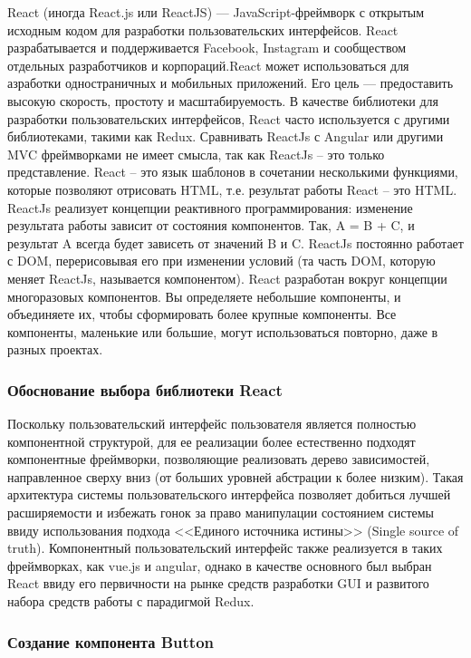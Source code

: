 React (иногда React.js или ReactJS) — JavaScript-фреймворк с открытым исходным кодом для разработки пользовательских интерфейсов.
React разрабатывается и поддерживается Facebook, Instagram и сообществом отдельных разработчиков и корпораций.React может использоваться для 
азработки одностраничных и мобильных приложений. Его цель — предоставить высокую скорость, простоту и масштабируемость. В качестве библиотеки для разработки 
пользовательских интерфейсов, React часто используется с другими библиотеками, такими как Redux.
Сравнивать ReactJs с Angular или другими MVC фреймворками не имеет смысла, так как ReactJs – это только представление. React – это язык шаблонов в сочетании 
несколькими функциями, которые позволяют отрисовать HTML, т.е. результат работы React – это HTML. ReactJs реализует концепции реактивного программирования: изменение 
результата работы зависит от состояния компонентов. Так, A = B + C, и результат A всегда будет зависеть от значений B и C. ReactJs постоянно работает с DOM, перерисовывая 
его при изменении условий (та часть DOM, которую меняет ReactJs, называется компонентом). 
React разработан вокруг концепции многоразовых компонентов. Вы определяете небольшие компоненты, и объединяете их, чтобы сформировать более крупные компоненты.
Все компоненты, маленькие или большие, могут использоваться повторно, даже в разных проектах.

\subsubsection{Обоснование выбора библиотеки React}
Поскольку пользовательский интерфейс пользователя является полностью компонентной структурой\cite{genesisgui}, для ее реализации более естественно подходят компонентные фреймворки, позволяющие
реализовать дерево зависимостей, направленное сверху вниз (от больших уровней абстрации к более низким). Такая архитектура системы пользовательского интерфейса позволяет добиться лучшей расширяемости
и избежать гонок за право манипулации состоянием системы ввиду использования подхода <<Единого источника истины>> (Single source of truth). Компонентный пользовательский интерфейс также реализуется
в таких фреймворках, как vue.js и angular, однако в качестве основного был выбран React ввиду его первичности на рынке средств разработки GUI и развитого набора средств работы с парадигмой Redux.

\subsubsection{Создание компонента Button}

